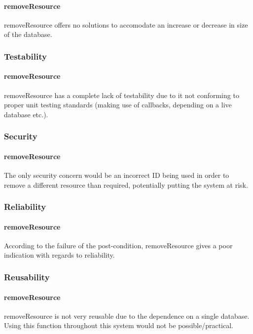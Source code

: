 \documentclass[a4paper]{article}
\begin{document}
\paragraph{removeResource}
removeResource offers no solutions to accomodate an increase or decrease in size of the database.

\subsubsection {Testability}

\paragraph{removeResource}
removeResource has a complete lack of testability due to it not conforming to proper unit testing standards (making use of callbacks, depending on a live database etc.).

\subsubsection {Security}

\paragraph{removeResource}
The only security concern would be an incorrect ID being used in order to remove a different resource than required, potentially putting the system at risk.

\subsubsection {Reliability}

\paragraph{removeResource}
According to the failure of the post-condition, removeResource gives a poor indication with regards to reliability.

\subsubsection {Reusability}

\paragraph{removeResource}
removeResource is not very reusable due to the dependence on a single database. Using this function throughout this system would not be possible/practical.
\end{document}
